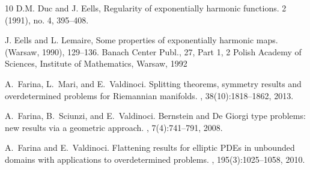 \documentclass[10 pt,a4paper]{article}
\theoremstyle{definition}
\begin{document}
\begin{thebibliography}{10}
D.M. Duc and J. Eells,
\newblock 
Regularity of exponentially harmonic functions.
 2 (1991), no. 4, 395--408.


J. Eells and L. Lemaire, 
\newblock Some properties of exponentially harmonic maps.
 (Warsaw, 1990), 129--136.
Banach Center Publ., 27, Part 1, 2
Polish Academy of Sciences, Institute of Mathematics, Warsaw, 1992



A.~Farina, L.~Mari, and E.~Valdinoci.
\newblock Splitting theorems, symmetry results and overdetermined problems for 
Riemannian manifolds.
, 
38(10):1818--1862, 2013.


A.~Farina, B.~Sciunzi, and E.~Valdinoci.
\newblock Bernstein and {D}e {G}iorgi type problems: new results via a
  geometric approach.
, 7(4):741--791, 2008.



A.~Farina and E.~Valdinoci.
\newblock Flattening results for elliptic {PDE}s in unbounded domains with
  applications to overdetermined problems.
, 195(3):1025--1058, 2010.


\end{thebibliography}
\end{document}
